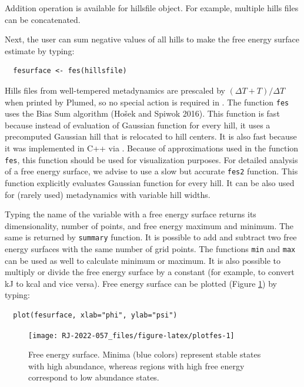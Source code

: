 Addition operation is available for hillsfile object. For example, multiple hills
files can be concatenated.

Next, the user can sum negative values of all hills to make the free energy surface
estimate by typing:

\begin{verbatim}
  fesurface <- fes(hillsfile)
\end{verbatim}

Hills files from well-tempered metadynamics are prescaled by \((\Delta T + T)/\Delta T\)
when printed by Plumed, so no special action is required in .
The function \texttt{fes} uses the Bias Sum algorithm (Hošek and Spiwok 2016). This function is
fast because instead of evaluation of Gaussian function for every hill, it uses
a precomputed Gaussian hill that is relocated to hill centers.
It is also fast because it was implemented in C++ via . Because of approximations
used in the function \texttt{fes}, this function should be used for visualization purposes.
For detailed analysis of a free energy surface, we advise to use a slow but accurate
\texttt{fes2} function. This function explicitly evaluates Gaussian function for every
hill. It can be also used for (rarely used) metadynamics with variable hill widths.

Typing the name of the variable with a free energy surface returns its dimensionality,
number of points, and free energy maximum and minimum. The same is returned by
\texttt{summary} function. It is possible
to add and subtract two free energy surfaces with the same number of grid points.
The functions \texttt{min} and \texttt{max} can be used as well to calculate minimum or
maximum. It is also possible to multiply or divide the free
energy surface by a constant (for example, to convert kJ to kcal and vice versa).
Free energy surface can be plotted (Figure \ref{fig:plotfes}) by typing:

\begin{verbatim}
  plot(fesurface, xlab="phi", ylab="psi")
\end{verbatim}

\begin{figure}

{\centering \texttt{[image: RJ-2022-057\_files/figure-latex/plotfes-1]} 

}

\caption{Free energy surface. Minima (blue colors) represent stable states with high abundance, whereas regions with high free energy correspond to low abundance states.}\label{fig:plotfes}
\end{figure}

